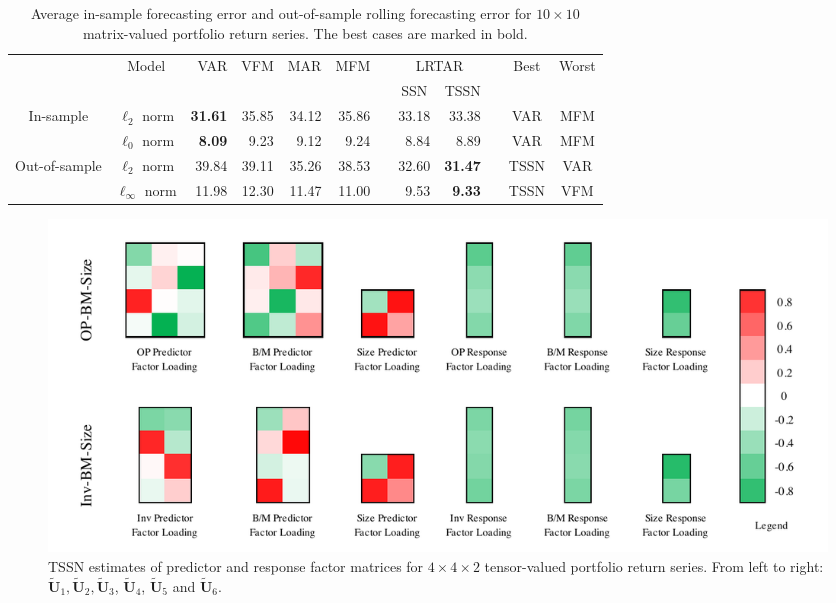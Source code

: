 \documentclass[12pt]{article}
\newcommand{\bm}{\boldsymbol}
\begin{document}
\begin{table}%
	\begin{center}
		\begin{tabular}{cc|rrrrrrrccc}
			\hline\hline
			&\multirow{2}{*}{Model} & \multirow{2}{*}{VAR} & \multirow{2}{*}{VFM} & \multirow{2}{*}{MAR} & \multirow{2}{*}{MFM} && \multicolumn{2}{c}{LRTAR} && \multirow{2}{*}{Best} & \multirow{2}{*}{Worst}\\
			\cline{8-9}
			&&&&&& & \multicolumn{1}{c}{SSN} & TSSN &&&\\
			\hline
			\multirow{2}{*}{In-sample}& $\ell_2$ norm & \bf{31.61} & 35.85 & 34.12 & 35.86 && 33.18 & 33.38 && VAR & MFM\\
			& $\ell_0$ norm & \bf{8.09} & 9.23 & 9.12 & 9.24 && 8.84 & 8.89 && VAR & MFM\\
			\hline
			\multirow{2}{*}{Out-of-sample}& $\ell_2$ norm & 39.84 & 39.11 & 35.26 & 38.53 && 32.60 & \bf{31.47} && TSSN & VAR\\
			& $\ell_\infty$ norm & 11.98 & 12.30 & 11.47 & 11.00 &&  9.53 & \bf{9.33} && TSSN & VFM\\
			\hline
		\end{tabular}
		\caption{Average in-sample forecasting error and out-of-sample rolling forecasting error for $10\times 10$ matrix-valued portfolio return series. The best cases are marked in bold.}
		\label{tbl:in-sample-error}
	\end{center}
\end{table}

\clearpage
\newpage

\begin{figure}
	\begin{center}
		\includegraphics[width=\textwidth]{factor_loading2.pdf}
	\end{center}
	\vspace{-1cm}
	\caption{TSSN estimates of predictor and response factor matrices for $4\times 4\times 2$ tensor-valued portfolio return series. From left to right: $\bm{\widetilde{U}}_1, \bm{\widetilde{U}}_2, \bm{\widetilde{U}}_3$, $\bm{\widetilde{U}}_4$, $\bm{\widetilde{U}}_5$ and $\bm{\widetilde{U}}_6$.}
	\label{fig:factor2}
\end{figure}
\end{document}
